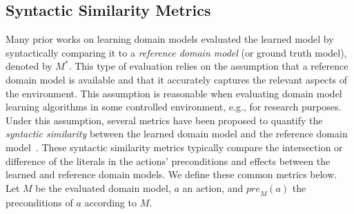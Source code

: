 \documentclass[letterpaper]{article} %
\newcommand{\pre}{\ensuremath{\textit{pre}}\xspace}
\newcommand{\realm}{{\ensuremath{M^*}}\xspace}
\newif\ifaddcomments
\newcommand{\roni}[1]{\ifaddcomments{\textcolor{red}{[Roni: #1]}}\fi}
\newcommand{\cm}[1]{\ifaddcomments{\textcolor{olive}{[Christian: #1]}}\fi}
\begin{document}
\subsection{Syntactic Similarity Metrics}
Many prior works on learning domain models evaluated the learned model by syntactically comparing it to a \emph{reference domain model} (or ground truth model), denoted by $\realm$. This type of evaluation relies on the assumption that a reference domain model 
is available and that it accurately captures the relevant aspects of the environment. 
This assumption is reasonable when evaluating domain model learning algorithms in some controlled environment, e.g., for research purposes. 
Under this assumption, several metrics have been proposed to quantify the \emph{syntactic similarity} between the learned domain model and the reference domain model~\citep{aineto2019learning,mordoch2023safe,xi2024neuro,Oswald2024DLLMDomainModeling}.
These syntactic similarity metrics typically compare the intersection or difference of the literals in the actions' preconditions and effects between the learned and reference domain models. 
We define these common metrics below. 
Let $M$ be the evaluated domain model, $a$ an action, and $\pre_M(a)$ the preconditions of $a$ according to $M$.

\end{document}
